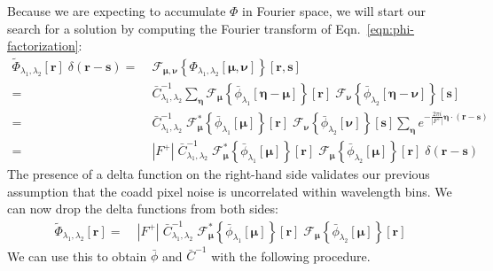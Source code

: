 \documentclass[DM,authoryear,toc]{lsstdoc}
\begin{document}
Because we are expecting to accumulate $\Phi$ in Fourier space, we will start our search for a solution by computing the Fourier transform of Eqn.~\ref{eqn:phi-factorization}:
\begin{align}
    \widetilde{\Phi}_{\lambda_1,\lambda_2}[\bm{r}]
    \;
    \delta(\bm{r}-\bm{s})
=&\;
    \mathcal{F}_{\bm{\mu},\bm{\nu}}\!\left\{
        \Phi_{\lambda_1,\lambda_2}[\bm{\mu},\bm{\nu}]
    \right\}\!\left[\bm{r},\bm{s}\right]
\\
=&\;
    \bar{C}^{-1}_{\lambda_1,\lambda_2}
    \sum_{\bm{\eta}}
    \mathcal{F}_{\bm{\mu}}\!\left\{
        \bar{\phi}_{\lambda_1}[\bm{\eta}-\bm{\mu}]
    \right\}\!\left[
        \bm{r}
    \right]
    \;
    \mathcal{F}_{\bm{\nu}}\!\left\{
        \bar{\phi}_{\lambda_2}[\bm{\eta}-\bm{\nu}]
    \right\}\!\left[
        \bm{s}
    \right]
\\
=&\;
    \bar{C}^{-1}_{\lambda_1,\lambda_2}
    \;
    \mathcal{F}^*_{\bm{\mu}}\!\left\{
        \bar{\phi}_{\lambda_1}[\bm{\mu}]
    \right\}\!\left[
        \bm{r}
    \right]
    \;
    \mathcal{F}_{\bm{\nu}}\!\left\{
        \bar{\phi}_{\lambda_2}[\bm{\nu}]
    \right\}\!\left[
        \bm{s}
    \right]
    \sum_{\bm{\eta}}
    e^{-\frac{2\pi i}{|F^+|} \bm{\eta}\cdot(\bm{r}-\bm{s})}
\\
=&\;
    |F^+|
    \;
    \bar{C}^{-1}_{\lambda_1,\lambda_2}
    \;
    \mathcal{F}^*_{\bm{\mu}}\!\left\{
        \bar{\phi}_{\lambda_1}[\bm{\mu}]
    \right\}\!\left[
        \bm{r}
    \right]
    \;
    \mathcal{F}_{\bm{\mu}}\!\left\{
        \bar{\phi}_{\lambda_2}[\bm{\mu}]
    \right\}\!\left[
        \bm{r}
    \right]
    \;
    \delta(\bm{r}-\bm{s})
\end{align}
The presence of a delta function on the right-hand side validates our previous assumption that the coadd pixel noise is uncorrelated within wavelength bins.
We can now drop the delta functions from both sides:
\begin{align}
    \widetilde{\Phi}_{\lambda_1,\lambda_2}[\bm{r}]
= & \;
    |F^+|
    \;
    \bar{C}^{-1}_{\lambda_1,\lambda_2}
    \;
    \mathcal{F}^*_{\bm{\mu}}\!\left\{
        \bar{\phi}_{\lambda_1}[\bm{\mu}]
    \right\}\!\left[
        \bm{r}
    \right]
    \;
    \mathcal{F}_{\bm{\mu}}\!\left\{
        \bar{\phi}_{\lambda_2}[\bm{\mu}]
    \right\}\!\left[
        \bm{r}
    \right]
\end{align}
We can use this to obtain $\bar{\phi}$ and $\bar{C}^{-1}$ with the following procedure.
\end{document}
